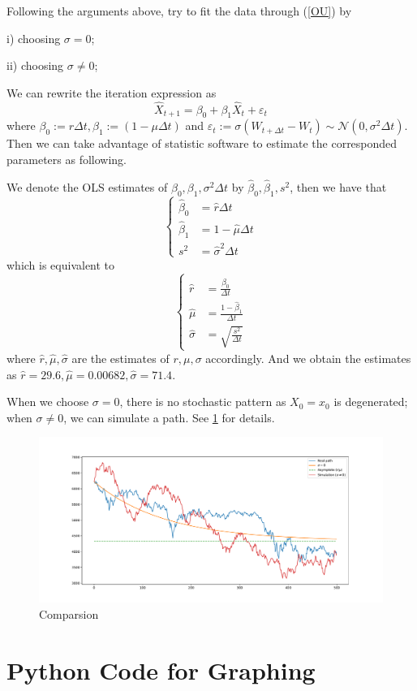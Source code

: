 \begin{question}
        Following the arguments above, try to fit the data through (\ref{OU}) by 

        i) choosing $\sigma=0$;

        ii) choosing $\sigma\neq0$;
    \end{question}
    We can rewrite the iteration expression as
    \[\hat X_{t+1}=
    \beta_0+\beta_1\hat X_t
    +\varepsilon_t\]
    where $\beta_0:=r\Delta t,\beta_1:=(1-\mu\Delta t)$
    and $\varepsilon_t:=\sigma(W_{t+\Delta t}-W_t)
    \sim\mathcal N(0,\sigma^2\Delta t)$.
    Then we can take advantage of statistic software to
    estimate the corresponded parameters as following.

    We denote the OLS estimates of $\beta_0,\beta_1,\sigma^2\Delta t$
    by $\hat\beta_0,\hat\beta_1,s^2$, then we have that
    \[\left\{\begin{aligned}
        \hat\beta_0&=\hat r\Delta t\\
        \hat\beta_1&=1-\hat\mu\Delta t\\
        s^2&=\hat\sigma^2\Delta t
    \end{aligned}\right.\]
    which is equivalent to
    \[\left\{\begin{aligned}
        \hat r&=\frac{\hat\beta_0}{\Delta t}\\
        \hat\mu&=\frac{1-\hat\beta_1}{\Delta t}\\
        \hat\sigma&=\sqrt{\frac{s^2}{\Delta t}}
    \end{aligned}\right.\]
    where $\hat r,\hat\mu,\hat\sigma$ are the estimates of $r,\mu,\sigma$
    accordingly.
    And we obtain the estimates as
    $\hat r=29.6,\hat\mu=0.00682,\hat\sigma=71.4$.

    When we choose $\sigma=0$, there is no stochastic pattern
    as $X_0=x_0$ is degenerated;
    when $\sigma\neq 0$, we can simulate a path.
    See \cref{fig:p5} for details.
    \begin{figure}[h]
        \centering
        \includegraphics[width=\textwidth]{figure}
        \caption{Comparsion}
        \label{fig:p5}
    \end{figure}

    \newpage
    \appendix
    \section{Python Code for Graphing}
    